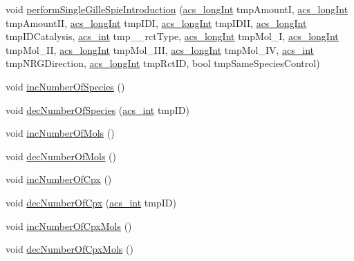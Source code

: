 \begin{DoxyCompactItemize}
void \hyperlink{classenvironment_a30a0827eed2860d03d5fa5318fcf86b0}{perform\-Single\-Gille\-Spie\-Introduction} (\hyperlink{acs__headers_8h_a19319d75f02db4308bc5c0026d98cd85}{acs\-\_\-long\-Int} tmp\-Amount\-I, \hyperlink{acs__headers_8h_a19319d75f02db4308bc5c0026d98cd85}{acs\-\_\-long\-Int} tmp\-Amount\-I\-I, \hyperlink{acs__headers_8h_a19319d75f02db4308bc5c0026d98cd85}{acs\-\_\-long\-Int} tmp\-I\-D\-I, \hyperlink{acs__headers_8h_a19319d75f02db4308bc5c0026d98cd85}{acs\-\_\-long\-Int} tmp\-I\-D\-I\-I, \hyperlink{acs__headers_8h_a19319d75f02db4308bc5c0026d98cd85}{acs\-\_\-long\-Int} tmp\-I\-D\-Catalysis, \hyperlink{acs__headers_8h_a8d277355641a098190360234e2ebde35}{acs\-\_\-int} tmp\-\_\-\-\_\-rct\-Type, \hyperlink{acs__headers_8h_a19319d75f02db4308bc5c0026d98cd85}{acs\-\_\-long\-Int} tmp\-Mol\-\_\-\-I, \hyperlink{acs__headers_8h_a19319d75f02db4308bc5c0026d98cd85}{acs\-\_\-long\-Int} tmp\-Mol\-\_\-\-I\-I, \hyperlink{acs__headers_8h_a19319d75f02db4308bc5c0026d98cd85}{acs\-\_\-long\-Int} tmp\-Mol\-\_\-\-I\-I\-I, \hyperlink{acs__headers_8h_a19319d75f02db4308bc5c0026d98cd85}{acs\-\_\-long\-Int} tmp\-Mol\-\_\-\-I\-V, \hyperlink{acs__headers_8h_a8d277355641a098190360234e2ebde35}{acs\-\_\-int} tmp\-N\-R\-G\-Direction, \hyperlink{acs__headers_8h_a19319d75f02db4308bc5c0026d98cd85}{acs\-\_\-long\-Int} tmp\-Rct\-I\-D, bool tmp\-Same\-Species\-Control)
\item 
void \hyperlink{classenvironment_a5c86f93c84f9931640843c38eccb9bf4}{inc\-Number\-Of\-Species} ()
\item 
void \hyperlink{classenvironment_a69a926e0b9bb4f4b29876d0e45b54d84}{dec\-Number\-Of\-Species} (\hyperlink{acs__headers_8h_a8d277355641a098190360234e2ebde35}{acs\-\_\-int} tmp\-I\-D)
\item 
void \hyperlink{classenvironment_ae356db3b6ee374b998e9f041216b4b75}{inc\-Number\-Of\-Mols} ()
\item 
void \hyperlink{classenvironment_af042f7904c92fdd239995bebbab2cf60}{dec\-Number\-Of\-Mols} ()
\item 
void \hyperlink{classenvironment_a69ae530ef6f9298e3ab8304157709404}{inc\-Number\-Of\-Cpx} ()
\item 
void \hyperlink{classenvironment_aadd057e7038269e6fac314a12a3bf334}{dec\-Number\-Of\-Cpx} (\hyperlink{acs__headers_8h_a8d277355641a098190360234e2ebde35}{acs\-\_\-int} tmp\-I\-D)
\item 
void \hyperlink{classenvironment_ab101d2158575829ddfe846087040f2fa}{inc\-Number\-Of\-Cpx\-Mols} ()
\item 
void \hyperlink{classenvironment_a756dc43b6b47498ba457613749324b15}{dec\-Number\-Of\-Cpx\-Mols} ()

\end{DoxyCompactItemize}

